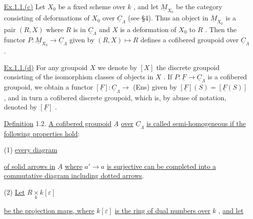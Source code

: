\underline{Ex.1.1.(c)}  Let  $X_0$  be a fixed scheme over  $k$  , and let  $\underline{M}_{X_0}$  be the category consisting of deformations of  $X_0$  over  $\underline{C}_{\Lambda}$  (see §4). Thus an object in $\underline{M}_{X_0}$  is a pair  $(R,X)$  where  $R$  is in  $\underline{C}_{\Lambda}$  and  $X$  is a deformation of  $X_0$  to $R$  . Then the functor  $P : \underline{M}_{X_0} \to \underline{C}_{\Lambda}$  given by  $(R,X) \longmapsto R$  defines a cofibered groupoid over  $\underline{C}_{\Lambda}$  .

\underline{Ex.1.1.(d)}  For any groupoid  $X$  we denote by  $[X]$  the discrete groupoid consisting of the isomorphism classes of objects in  $X$  . If  $P : \underline{F} \to \underline{C}_{\Lambda}$  is a cofibered groupoid, we obtain a functor  $[\underline{F}] : \underline{C}_{\Lambda} \to$ (Ens)  given by $[\underline{F}](S) = [\underline{F}(S)]$  , and in turn a cofibered discrete groupoid, which is, by abuse of notation, denoted by  $[\underline{F}]$  .

\underline{Definition} 1.2.  \underline{A cofibered groupoid}  $\underline{A}$  \underline{over}  $\underline{C}_{\Lambda}$  \underline{is called semi-homogeneous if the following properties hold}:

(1) \underline{every diagram}

\begin{center}
\end{center}
\underline{of solid arrows in}  $\underline{A}$  \underline{where}  $a' \to a$  \underline{is surjective can be completed into a commutative diagram including dotted arrows}.

(2) \underline{Let}  $R \underset{k}{\times} k[\varepsilon]$

\begin{center}
\end{center}
\underline{be the projection maps, where}  $k[\varepsilon]$  \underline{is the ring of dual numbers over}  $k$  , \underline{and let}

